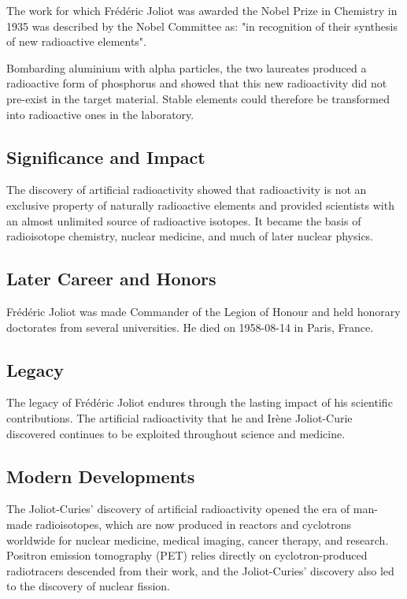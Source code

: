 The work for which Frédéric Joliot was awarded the Nobel Prize in Chemistry in 1935 was described by the Nobel Committee as: "in recognition of their synthesis of new radioactive elements".

Bombarding aluminium with alpha particles, the two laureates produced a radioactive form of phosphorus and showed that this new radioactivity did not pre-exist in the target material.
Stable elements could therefore be transformed into radioactive ones in the laboratory.

\subsection*{Significance and Impact}

The discovery of artificial radioactivity showed that radioactivity is not an exclusive property of naturally radioactive elements and provided scientists with an almost unlimited source of radioactive isotopes.
It became the basis of radioisotope chemistry, nuclear medicine, and much of later nuclear physics.

\subsection*{Later Career and Honors}

Frédéric Joliot was made Commander of the Legion of Honour and held honorary doctorates from several universities.
He died on 1958-08-14 in Paris, France.

\subsection*{Legacy}

The legacy of Frédéric Joliot endures through the lasting impact of his scientific contributions.
The artificial radioactivity that he and Irène Joliot-Curie discovered continues to be exploited throughout science and medicine.

\subsection*{Modern Developments}

The Joliot-Curies' discovery of artificial radioactivity opened the era of man-made radioisotopes, which are now produced in reactors and cyclotrons worldwide for nuclear medicine, medical imaging, cancer therapy, and research. Positron emission tomography (PET) relies directly on cyclotron-produced radiotracers descended from their work, and the Joliot-Curies' discovery also led to the discovery of nuclear fission.

